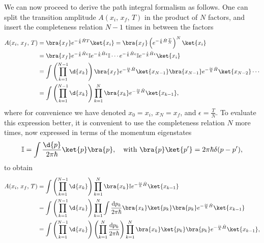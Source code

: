 We can now proceed to derive the path integral formalism as follows. One can split the transition amplitude \(A(x_i,\,x_f,\,T)\) in the product of \(N\) factors, and insert the completeness relation \(N-1\) times in between the factors
\[
    \begin{aligned}
        A(x_i,\,x_f,\,T) & = \bra{x_f} e^{-\frac{i}{\hbar} \hat{H} T} \ket{x_i} = \bra{x_f} \left(e^{-\frac{i}{\hbar} \hat{H} \frac{T}{N}}\right)^N \ket{x_i}                                                                                    \\
                         & = \bra{x_f} e^{-\frac{i}{\hbar} \hat{H} \epsilon} \mathbb{I} e^{-\frac{i}{\hbar} \hat{H} \epsilon} \mathbb{I} \cdots e^{-\frac{i}{\hbar} \hat{H} \epsilon} \mathbb{I} e^{-\frac{i}{\hbar} \hat{H} \epsilon} \ket{x_i} \\
                         & = \int \left(\prod_{k=1}^{N-1} \d{x_k}\right) \bra{x_f} e^{-\frac{i\epsilon}{\hbar}\hat{H}} \ket{x_{N-1}} \bra{x_{N-1}} e^{-\frac{i\epsilon}{\hbar}\hat{H}} \ket{x_{N-2}} \cdots                                      \\
                         & = \int \left(\prod_{k=1}^{N-1} \d{x_k}\right) \prod_{k=1}^{N} \bra{x_k} e^{-\frac{i\epsilon}{\hbar}\hat{H}} \ket{x_{k-1}},
    \end{aligned}
\]
where for convenience we have denoted \(x_0 = x_i\), \(x_N = x_f\), and \(\epsilon = \frac{T}{N}\). To evaluate this expression better, it is convenient to use the completeness relation \(N\) more times, now expressed in terms of the momentum eigenstates
\[
    \mathbb{I} = \int \frac{\d{p}}{2\pi \hbar} \ket{p} \bra{p}, \quad \text{with } \bra{p}\ket{p^{\prime}} = 2\pi\hbar \delta(p-p^{\prime}),
\]
to obtain
\[
    \begin{aligned}
        A(x_i,\,x_f,\,T) & = \int \left(\prod_{k=1}^{N-1} \d{x_k}\right) \prod_{k=1}^{N} \bra{x_k} \mathbb{I} e^{-\frac{i\epsilon}{\hbar}\hat{H}} \ket{x_{k-1}}                                                                         \\
                         & = \int \left(\prod_{k=1}^{N-1} \d{x_k}\right) \prod_{k=1}^{N} \int \frac{\mathrm{d} p_k}{2\pi \hbar}\bra{x_k}\ket{p_k} \bra{p_k} e^{-\frac{i\epsilon}{\hbar}\hat{H}} \ket{x_{k-1}}                           \\
                         & = \int \left(\prod_{k=1}^{N-1} \d{x_k}\right) \left(\prod_{k=1}^{N} \frac{\mathrm{d} p_k}{2\pi \hbar}\right) \prod_{k=1}^{N} \bra{x_k}\ket{p_k} \bra{p_k} e^{-\frac{i\epsilon}{\hbar}\hat{H}} \ket{x_{k-1}},
    \end{aligned}
\]
